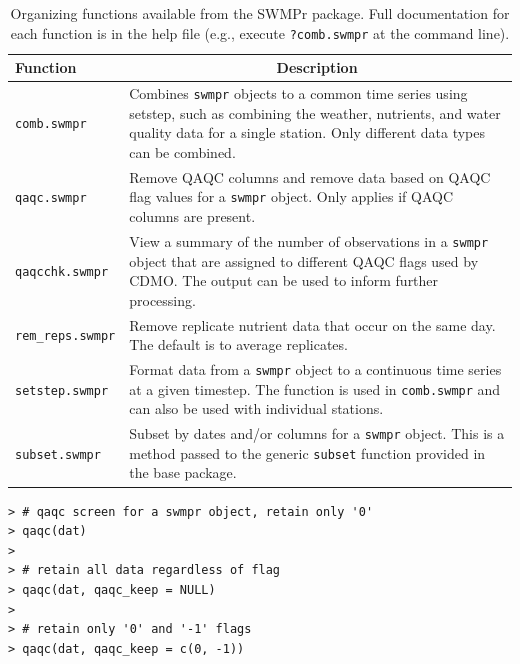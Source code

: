 \documentclass[10pt,letterpaper]{article}\usepackage[]{graphicx}\usepackage[]{color}
\makeatletter
\newenvironment{kframe}{%
 \def\at@end@of@kframe{}%
 \ifinner\ifhmode%
  \def\at@end@of@kframe{\end{minipage}}%
  \begin{minipage}{\columnwidth}%
 \fi\fi%
 \def\FrameCommand##1{\hskip\@totalleftmargin \hskip-\fboxsep
 \colorbox{shadecolor}{##1}\hskip-\fboxsep
     \hskip-\linewidth \hskip-\@totalleftmargin \hskip\columnwidth}%
 \MakeFramed {\advance\hsize-\width
   \@totalleftmargin\z@ \linewidth\hsize
   \@setminipage}}%
 {\par\unskip\endMakeFramed%
 \at@end@of@kframe}
\newenvironment{knitrout}{}{} %
\makeatother
\begin{document}
\begin{table}[!tbp]
\caption{Organizing functions available from the SWMPr package. Full documentation for each function is in the help file (e.g., execute \texttt{?comb.swmpr} at the command line).\label{tab:organize}} 
\begin{center}
\begin{tabular}{lp{3.5in}}
\hline\hline
\multicolumn{1}{l}{Function}&\multicolumn{1}{c}{Description}\tabularnewline
\hline
\texttt{comb.swmpr}&Combines \texttt{swmpr} objects to a common time series using setstep, such as combining the weather, nutrients, and water quality data for a single station. Only different data types can be combined.\tabularnewline
\texttt{qaqc.swmpr}&Remove \ac{QAQC} columns and remove data based on \ac{QAQC} flag values for a \texttt{swmpr} object.  Only applies if \ac{QAQC} columns are present. \tabularnewline
\texttt{qaqcchk.swmpr}&View a summary of the number of observations in a \texttt{swmpr} object that are assigned to different \ac{QAQC} flags used by \ac{CDMO}.  The output can be used to inform further processing.\tabularnewline
\texttt{rem\_reps.swmpr}&Remove replicate nutrient data that occur on the same day.  The default is to average replicates.\tabularnewline
\texttt{setstep.swmpr}&Format data from a \texttt{swmpr} object to a continuous time series at a given timestep.  The function is used in \texttt{comb.swmpr} and can also be used with individual stations.\tabularnewline
\texttt{subset.swmpr}&Subset by dates and/or columns for a \texttt{swmpr} object.  This is a method passed to the generic \texttt{subset} function provided in the base package.\tabularnewline
\hline
\end{tabular}\end{center}

\end{table}


\begin{knitrout}
\color{fgcolor}\begin{kframe}
\begin{verbatim}
> # qaqc screen for a swmpr object, retain only '0'
> qaqc(dat)
> 
> # retain all data regardless of flag
> qaqc(dat, qaqc_keep = NULL)
> 
> # retain only '0' and '-1' flags
> qaqc(dat, qaqc_keep = c(0, -1))
\end{verbatim}
\end{kframe}
\end{knitrout}
\end{document}
